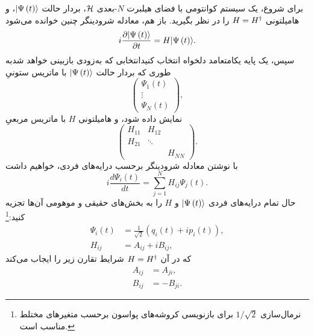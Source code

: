 \documentclass{article}
\begin{document}
برای شروع، یک سیستم کوانتومی با فضای هیلبرت $N$-بعدی $\mathcal{H}$، بردار حالت $\vert\Psi\left(t\right)\rangle$، و هامیلتونی $H=H^{\dagger}$ را در نظر بگیرید. باز هم، معادله شرودینگر چنین خوانده می‌شود
\[
i\frac{\partial\vert\Psi\left(t\right)\rangle}{\partial t}=H\vert\Psi\left(t\right)\rangle.
\]
 سپس، یک پایه یکامتعامد دلخواه انتخاب کنید\textemdash انتخابی که به‌زودی بازبینی خواهد شد\textemdash به طوری که بردار حالت $\vert\Psi\left(t\right)\rangle$ با ماتریس ستونیِ
\begin{equation}
\begin{pmatrix}\Psi_{1}\left(t\right)\\
\vdots\\
\Psi_{N}\left(t\right)
\end{pmatrix},\label{eq:StateVectorAsColumnMatrix}
\end{equation}
 نمایش داده شود، و هامیلتونی $H$ با ماتریس مربعیِ
\begin{equation}
\begin{pmatrix}H_{11} & H_{12}\\
H_{21} & \ddots\\
 &  & H_{NN}
\end{pmatrix}.\label{eq:HamiltonianAsSquareMatrix}
\end{equation}
 با نوشتن معادله شرودینگر برحسب درایه‌های فردی، خواهیم داشت
\begin{equation}
i\frac{d\Psi_{i}\left(t\right)}{dt}=\sum_{j=1}^{N}H_{ij}\Psi_{j}\left(t\right).\label{eq:SchroEqInComponents}
\end{equation}
 حال تمام درایه‌های فردی $\vert\Psi\left(t\right)\rangle$ و $H$ را به بخش‌های حقیقی و موهومی آن‌ها تجزیه کنید:\footnote{نرمال‌سازی $1/\sqrt{2}$ برای بازنویسی کروشه‌های پواسون برحسب متغیرهای مختلط مناسب است.}
\begin{equation}
\begin{aligned}\Psi_{i}\left(t\right) & =\frac{1}{\sqrt{2}}\left(q_{i}\left(t\right)+ip_{i}\left(t\right)\right),\\
H_{ij} & =A_{ij}+iB_{ij},
\end{aligned}
\label{eq:StateVectorAndHamiltonianInComponents}
\end{equation}
 که در آن $H=H^{\dagger}$ شرایط تقارن زیر را ایجاب می‌کند
\begin{equation}
\begin{aligned}A_{ij} & =A_{ji},\\
B_{ij} & =-B_{ji}.
\end{aligned}
\label{eq:HamiltonianEntriesRealityConditions}
\end{equation}
\end{document}

